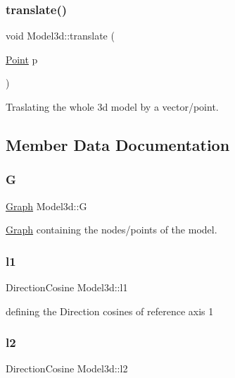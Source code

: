 \subsubsection{\texorpdfstring{translate()}{translate()}}
{\footnotesize\ttfamily void Model3d\+::translate (\begin{DoxyParamCaption}\item[{\mbox{\hyperlink{class_point}{Point}}}]{p }\end{DoxyParamCaption})}



Traslating the whole 3d model by a vector/point. 



\subsection{Member Data Documentation}
\mbox{\label{class_model3d_a829515bcb9101d6cb75d9a7bd4ebe866}} 
\subsubsection{\texorpdfstring{G}{G}}
{\footnotesize\ttfamily \mbox{\hyperlink{class_graph}{Graph}} Model3d\+::G}



\mbox{\hyperlink{class_graph}{Graph}} containing the nodes/points of the model. 

\mbox{\label{class_model3d_a25fe8f02e27963f4258e33e111767a91}} 
\subsubsection{\texorpdfstring{l1}{l1}}
{\footnotesize\ttfamily Direction\+Cosine Model3d\+::l1}



defining the Direction cosines of reference axis 1 

\mbox{\label{class_model3d_a5fdb6197364007eb98da77f39e19a5b2}} 
\subsubsection{\texorpdfstring{l2}{l2}}
{\footnotesize\ttfamily Direction\+Cosine Model3d\+::l2}



